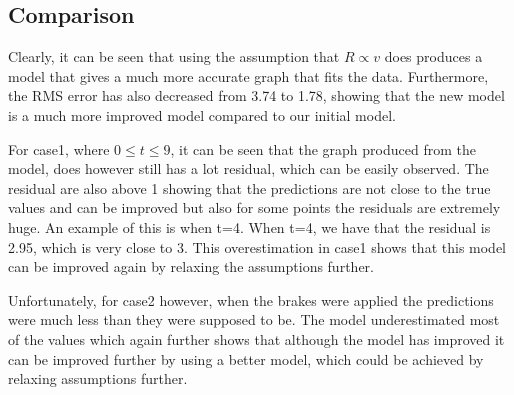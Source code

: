 \subsection{Comparison}
Clearly, it can be seen that using the assumption that $R \propto v$ does produces a model that gives a much more accurate graph that fits the data. Furthermore, the RMS error has also decreased from 3.74 to 1.78, showing that the new model is a much more improved model compared to our initial model.

For case1, where $0 \leq t \leq 9$, it can be seen that the graph produced from the model, does however still has a lot residual, which can be easily observed. The residual are also above 1 showing that the predictions are not close to the true values and can be improved but also for some points the residuals are extremely huge. An example of this is when t=4. When t=4, we have that the residual is 2.95, which is very close to 3. This overestimation in case1 shows that this model can be improved again by relaxing the assumptions further.

Unfortunately, for case2 however, when the brakes were applied the predictions were much less than they were supposed to be. The model underestimated most of the values which again further shows that although the model has improved it can be improved further by using a better model, which could be achieved by relaxing assumptions further.
